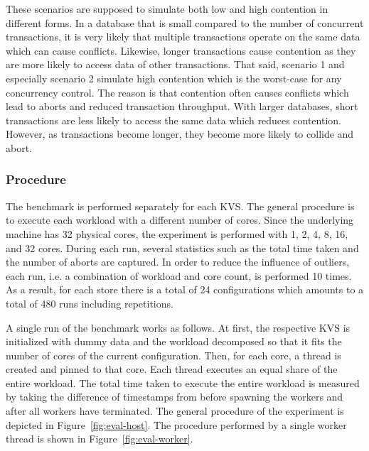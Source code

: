 These scenarios are supposed to simulate both low and high contention in
different forms. In a database that is small compared to the number of
concurrent transactions, it is very likely that multiple transactions operate on
the same data which can cause conflicts. Likewise, longer transactions cause
contention as they are more likely to access data of other transactions. That
said, scenario 1 and especially scenario 2 simulate high contention which is the
worst-case for any concurrency control. The reason is that contention often
causes conflicts which lead to aborts and reduced transaction throughput. With
larger databases, short transactions are less likely to access the same data
which reduces contention. However, as transactions become longer, they become
more likely to collide and abort.

\subsubsection{Procedure}

The benchmark is performed separately for each KVS. The general procedure is to
execute each workload with a different number of cores. Since the underlying
machine has 32 physical cores, the experiment is performed with 1, 2, 4, 8, 16,
and 32 cores. During each run, several statistics such as the total time taken
and the number of aborts are captured. In order to reduce the influence of
outliers, each run, i.e. a combination of workload and core count, is performed
10 times. As a result, for each store there is a total of 24 configurations
which amounts to a total of 480 runs including repetitions.

A single run of the benchmark works as follows. At first, the respective KVS is initialized with dummy data and the workload decomposed so that it fits the number of cores of the current configuration. Then, for each core, a thread is created and pinned to that core. Each thread executes an equal share of the entire workload. The total time taken to execute the entire workload is measured by taking the difference of timestamps from before spawning the workers and after all workers have terminated. The general procedure of the experiment is depicted in Figure~\ref{fig:eval-host}. The procedure performed by a single worker thread is shown in Figure~\ref{fig:eval-worker}.


